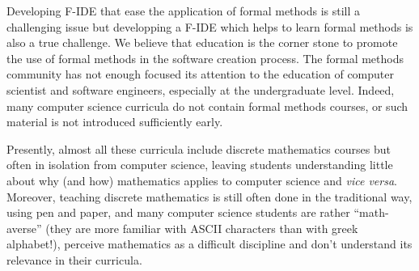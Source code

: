 \documentclass[submission,copyright,creativecommons]{eptcs}
\begin{document}
Developing F-IDE that ease the application of
formal methods is still  a challenging issue but
developping a F-IDE
which helps to learn formal methods is also a true challenge.
We believe that education is the corner stone
to promote the use of formal methods in
the software creation process.
The formal methods community has not enough focused its
attention to the education of computer scientist and software
engineers, especially at the undergraduate level.
Indeed, many computer science curricula
do not contain formal methods courses, or such 
material is not introduced sufficiently early. 

Presently, almost all these curricula include discrete mathematics courses but
often in isolation from computer science, leaving students
understanding little about why (and how) mathematics applies to computer science
and {\it vice versa}. Moreover,
teaching discrete mathematics is still often done in the traditional
way, using pen and paper, and
many computer science students are rather
``math-averse''
(they
are more familiar with ASCII characters than with greek alphabet!), perceive mathematics as a difficult discipline and
don't  understand its relevance in their curricula.
\end{document}
